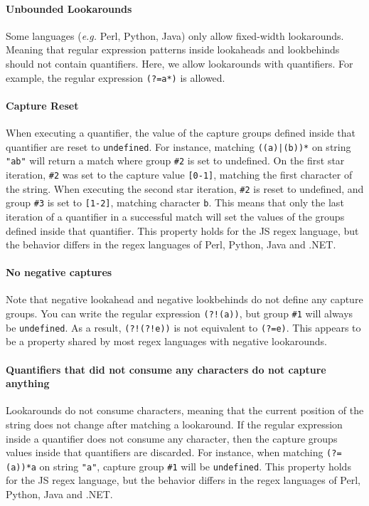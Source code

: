 \documentclass{article}
\def\regex#1{\lstinline[style=rgx]{#1}}
\def\undef{\texttt{undefined}}
\def\str#1{\texttt{"#1"}}
\def\group#1{\texttt{\##1}}
\begin{document}
\paragraph{Unbounded Lookarounds}
Some languages (\emph{e.g.} Perl, Python, Java) only allow fixed-width lookarounds. Meaning that regular expression patterns inside lookaheads and lookbehinds should not contain quantifiers.
Here, we allow lookarounds with quantifiers.
For example, the regular expression \regex{(?=a*)} is allowed.

\paragraph{Capture Reset}
When executing a quantifier, the value of the capture groups defined inside that quantifier are reset to \undef.
For instance, matching \regex{((a)|(b))*} on string \str{ab} will return a match where group \group{2} is set to undefined.
On the first star iteration, \group{2} was set to the capture value \texttt{[0-1]}, matching the first character of the string.
When executing the second star iteration, \group{2} is reset to undefined, and group \group{3} is set to \texttt{[1-2]}, matching character \texttt{b}.
This means that only the last iteration of a quantifier in a successful match will set the values of the groups defined inside that quantifier.
This property holds for the JS regex language, but the behavior differs in the regex languages of Perl, Python, Java and .NET.

\paragraph{No negative captures}
Note that negative lookahead and negative lookbehinds do not define any capture groups.
You can write the regular expression \regex{(?!(a))}, but group \group{1} will always be \undef.
As a result, \regex{(?!(?!e))} is not equivalent to \regex{(?=e)}.
This appears to be a property shared by most regex languages with negative lookarounds.

\paragraph{Quantifiers that did not consume any characters do not capture anything}
Lookarounds do not consume characters, meaning that the current position of the string does not change after matching a lookaround.
If the regular expression inside a quantifier does not consume any character, then the capture groups values inside that quantifiers are discarded.
For instance, when matching \regex{(?=(a))*a} on string \str{a}, capture group \group{1} will be \undef.
This property holds for the JS regex language, but the behavior differs in the regex languages of Perl, Python, Java and .NET.
\end{document}
